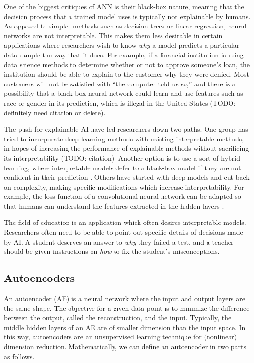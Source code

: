 One of the biggest critiques of ANN is their black-box nature, meaning that the decision process that a trained model uses is typically not explainable by humans. As opposed to simpler methods such as decision trees or linear regression, neural networks are not interpretable. This makes them less desirable in certain applications where researchers wish to know \textit{why} a model predicts a particular data sample the way that it does. For example, if a financial institution is using data science methods to determine whether or not to approve someone's loan, the institution should be able to explain to the customer why they were denied. Most customers will not be satisfied with ``the computer told us so,'' and there is a possibility that a black-box neural network could learn and use features such as race or gender in its prediction, which is illegal in the United States (TODO: definitely need citation or delete).

The push for explainable AI have led researchers down two paths. One group has tried to incorporate deep learning methods with existing interpretable methods, in hopes of increasing the performance of explainable methods without sacrificing its interpretability (TODO: citation). Another option is to use a sort of hybrid learning, where interpretable models defer to a black-box model if they are not confident in their prediction \cite{rafique2020}. Others have started with deep models and cut back on complexity, making specific modifications which increase interpretability. For example, the loss function of a convolutional neural network can be adapted so that humans can understand the features extracted in the hidden layers \cite{zhang2018interpretable}. 

The field of education is an application which often desires interpretable models. Researchers often need to be able to point out specific details of decisions made by AI. A student deserves an answer to \textit{why} they failed a test, and a teacher should be given instructions on \textit{how} to fix the student's misconceptions.

\subsection{Autoencoders}
An autoencoder (AE) is a neural network where the input and output layers are the same shape. The objective for a given data point is to minimize the difference between the output, called the reconstruction, and the input. Typically, the middle hidden layers of an AE are of smaller dimension than the input space. In this way, autoencoders are an unsupervised learning technique for (nonlinear) dimension reduction. Mathematically, we can define an autoencoder in two parts as follows.


